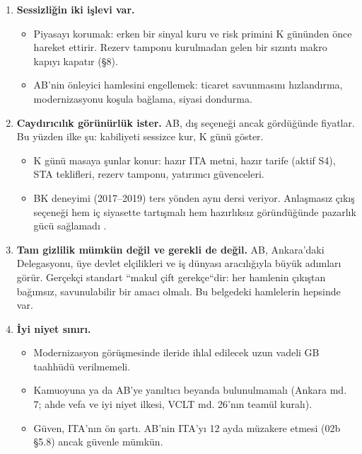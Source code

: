 \begin{enumerate}
\def\labelenumi{\arabic{enumi}.}
\tightlist
\item
  \textbf{Sessizliğin iki işlevi var.}

  \begin{itemize}
  \tightlist
  \item
    Piyasayı korumak: erken bir sinyal kuru ve risk primini K gününden önce hareket ettirir. Rezerv tamponu kurulmadan gelen bir sızıntı makro kapıyı kapatır (§8).
  \item
    AB'nin önleyici hamlesini engellemek: ticaret savunmasını hızlandırma, modernizasyonu koşula bağlama, siyasi dondurma.
  \end{itemize}
\item
  \textbf{Caydırıcılık görünürlük ister.} AB, dış seçeneği ancak gördüğünde fiyatlar. Bu yüzden ilke şu: kabiliyeti sessizce kur, K günü göster.

  \begin{itemize}
  \tightlist
  \item
    K günü masaya şunlar konur: hazır ITA metni, hazır tarife (aktif S4), STA teklifleri, rezerv tamponu, yatırımcı güvenceleri.
  \item
    BK deneyimi (2017--2019) ters yönden aynı dersi veriyor. Anlaşmasız çıkış seçeneği hem iç siyasette tartışmalı hem hazırlıksız göründüğünde pazarlık gücü sağlamadı \etiketH{}.
  \end{itemize}
\item
  \textbf{Tam gizlilik mümkün değil ve gerekli de değil.} AB, Ankara'daki Delegasyonu, üye devlet elçilikleri ve iş dünyası aracılığıyla büyük adımları görür. Gerçekçi standart ``makul çift gerekçe``dir: her hamlenin çıkıştan bağımsız, savunulabilir bir amacı olmalı. Bu belgedeki hamlelerin hepsinde var.
\item
  \textbf{İyi niyet sınırı.}

  \begin{itemize}
  \tightlist
  \item
    Modernizasyon görüşmesinde ileride ihlal edilecek uzun vadeli GB taahhüdü verilmemeli.
  \item
    Kamuoyuna ya da AB'ye yanıltıcı beyanda bulunulmamalı (Ankara md. 7; ahde vefa ve iyi niyet ilkesi, VCLT md. 26'nın teamül kuralı).
  \item
    Güven, ITA'nın ön şartı. AB'nin ITA'yı 12 ayda müzakere etmesi (02b §5.8) ancak güvenle mümkün.
  \end{itemize}
\end{enumerate}

